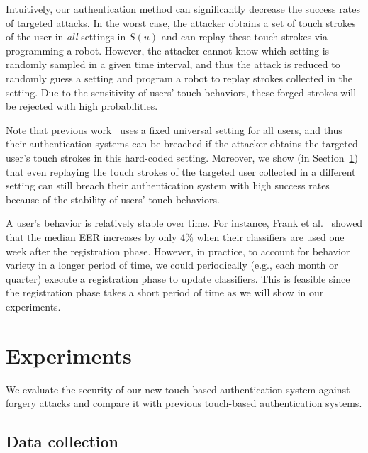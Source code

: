 \documentclass{sig-alternate-05-2015}
\begin{document}
Intuitively, our authentication method can significantly decrease the success rates 
of 
targeted attacks.  In the worst case, the attacker obtains a set of touch
strokes of the user in \emph{all} settings in $S(u)$ and can replay these touch
strokes via programming a robot. However, the attacker cannot know which setting is randomly sampled in
a given time interval, and thus the attack is reduced to randomly guess a setting and 
program a robot to replay strokes collected in the setting. 
Due to the sensitivity of users' touch behaviors,  these forged  
strokes will be rejected with high probabilities.


Note that previous work~\cite{frank2013touchalytics,li2013unobservable} uses a fixed universal setting for
 all users, and thus their authentication systems can be breached if the
attacker obtains the targeted user's touch strokes in this hard-coded setting. Moreover, we
show (in Section~\ref{sec:exp}) that even replaying the touch strokes of
the targeted user collected in a different setting can still breach their
authentication system with high success rates because of the stability of users' touch behaviors.


A user's behavior is relatively stable  over time. For instance, Frank et
al.~\cite{frank2013touchalytics} showed that the median EER increases by only
4\% when their classifiers are used  one week after the registration phase.
However, in practice, to account for behavior variety in a longer period of
time,  we could periodically (e.g., each month or quarter) execute a
registration phase to update classifiers.  This is feasible since the
registration phase takes a short period of time as we will show in our
experiments.













\section{Experiments}
\label{sec:exp}


We evaluate the security of our new touch-based authentication system against forgery attacks 
and compare it with previous touch-based authentication systems. 



\subsection{Data collection}
\end{document}
